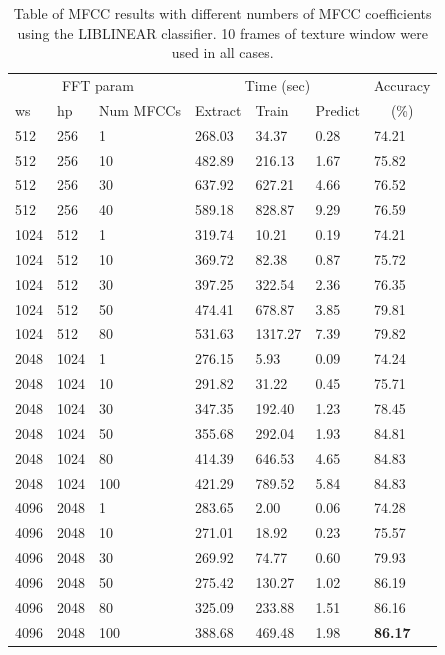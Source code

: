 \documentclass[12pt,oneside]{book}
\begin{document}
\begin{table}
\begin{tabular}{|l|l|l|l|l|l|l|}
\hline
\multicolumn{3}{|c}{FFT param} & \multicolumn{3}{|c|}{Time (sec)} & Accuracy \\
\hhline{|-|-|-|-|-|-|~|}
ws & hp & Num MFCCs & Extract & Train & Predict & \multicolumn{1}{c|}{(\%)} \\
\hhline{|=|=|=|=|=|=|=|}
 512  &  256  &  1      &    268.03  &    34.37  &   0.28  &  74.21  \\
 512  &  256  &  10     &    482.89  &   216.13  &   1.67  &  75.82  \\
 512  &  256  &  30     &    637.92  &   627.21  &   4.66  &  76.52  \\
 512  &  256  &  40     &    589.18  &   828.87  &   9.29  &  76.59  \\
\hline
 1024  &  512  &  1     &    319.74  &    10.21  &   0.19  &  74.21  \\
 1024  &  512  &  10    &    369.72  &    82.38  &   0.87  &  75.72  \\
 1024  &  512  &  30    &    397.25  &   322.54  &   2.36  &  76.35  \\
 1024  &  512  &  50    &    474.41  &   678.87  &   3.85  &  79.81  \\
 1024  &  512  &  80    &    531.63  &  1317.27  &   7.39  &  79.82  \\
\hline
 2048  &  1024  &  1    &    276.15  &     5.93  &   0.09  &  74.24  \\
 2048  &  1024  &  10   &    291.82  &    31.22  &   0.45  &  75.71  \\
 2048  &  1024  &  30   &    347.35  &   192.40  &   1.23  &  78.45  \\
 2048  &  1024  &  50   &    355.68  &   292.04  &   1.93  &  84.81  \\
 2048  &  1024  &  80   &    414.39  &   646.53  &   4.65  &  84.83  \\
 2048  &  1024  &  100  &    421.29  &   789.52  &   5.84  &  84.83  \\
\hline
 4096  &  2048  &  1    &    283.65  &     2.00  &   0.06  &  74.28  \\
 4096  &  2048  &  10   &    271.01  &    18.92  &   0.23  &  75.57  \\
 4096  &  2048  &  30   &    269.92  &    74.77  &   0.60  &  79.93  \\
 4096  &  2048  &  50   &    275.42  &   130.27  &   1.02  &  86.19  \\
 4096  &  2048  &  80   &    325.09  &   233.88  &   1.51  &  86.16  \\
 4096  &  2048  &  100  &    388.68  &   469.48  &   1.98  &  \textbf{86.17}  \\
\hline
\end{tabular}
\caption{Table of MFCC results with different numbers of MFCC
  coefficients using the LIBLINEAR classifier.  10 frames of texture
  window were used in all cases.}
\label{table:obv-numMfccs}
\end{table}
\end{document}
